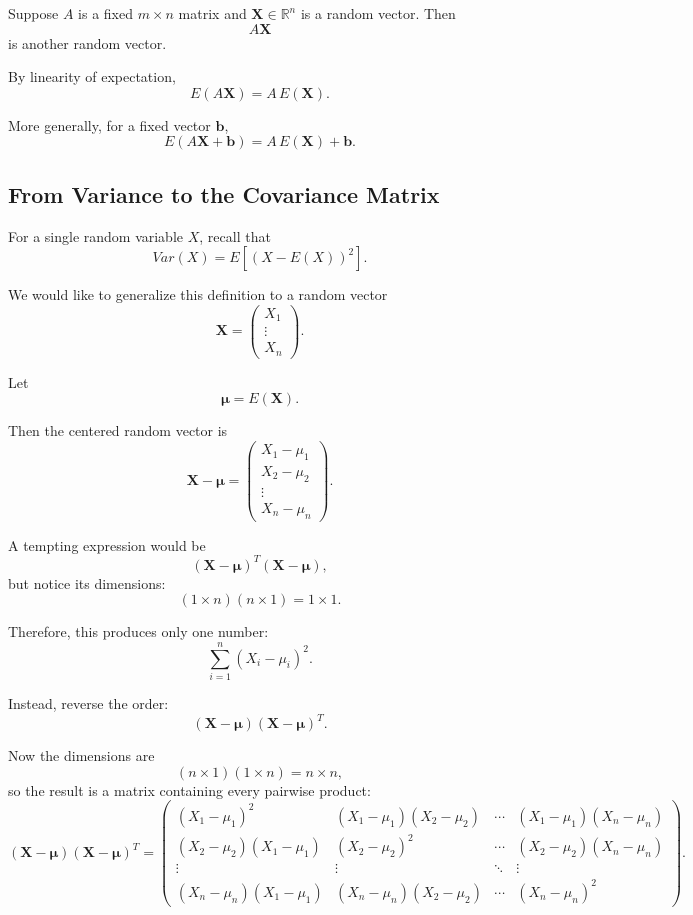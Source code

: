 \documentclass[11pt]{article}
\theoremstyle{definition}
\theoremstyle{plain}
\theoremstyle{remark}
\begin{document}
Suppose $A$ is a fixed $m\times n$ matrix and
$\mathbf{X}\in\mathbb{R}^n$ is a random vector. Then
\[
A\mathbf{X}
\]
is another random vector.

By linearity of expectation,
\[
{
E(A\mathbf{X})=A\,E(\mathbf{X}).
}
\]

More generally, for a fixed vector $\mathbf{b}$,
\[
{
E(A\mathbf{X}+\mathbf{b})
=
A\,E(\mathbf{X})+\mathbf{b}.
}
\]


\subsection*{From Variance to the Covariance Matrix}

For a single random variable $X$, recall that
\[
Var(X)
=
E\left[(X-E(X))^2\right].
\]

We would like to generalize this definition to a random vector
\[
\mathbf{X}
=
\begin{pmatrix}
X_1\\
\vdots\\
X_n
\end{pmatrix}.
\]

Let
\[
\boldsymbol{\mu}=E(\mathbf{X}).
\]

Then the centered random vector is
\[
\mathbf{X}-\boldsymbol{\mu}
=
\begin{pmatrix}
X_1-\mu_1\\
X_2-\mu_2\\
\vdots\\
X_n-\mu_n
\end{pmatrix}.
\]

A tempting expression would be
\[
(\mathbf{X}-\boldsymbol{\mu})^T
(\mathbf{X}-\boldsymbol{\mu}),
\]
but notice its dimensions:
\[
(1\times n)(n\times1)
=
1\times1.
\]

Therefore, this produces only one number:
\[
\sum_{i=1}^n(X_i-\mu_i)^2.
\]

Instead, reverse the order:
\[
(\mathbf{X}-\boldsymbol{\mu})
(\mathbf{X}-\boldsymbol{\mu})^T.
\]

Now the dimensions are
\[
(n\times1)(1\times n)
=
n\times n,
\]
so the result is a matrix containing every pairwise product:
\[
(\mathbf{X}-\boldsymbol{\mu})
(\mathbf{X}-\boldsymbol{\mu})^T
=
\begin{pmatrix}
(X_1-\mu_1)^2
&
(X_1-\mu_1)(X_2-\mu_2)
&
\cdots
&
(X_1-\mu_1)(X_n-\mu_n)
\\
(X_2-\mu_2)(X_1-\mu_1)
&
(X_2-\mu_2)^2
&
\cdots
&
(X_2-\mu_2)(X_n-\mu_n)
\\
\vdots&\vdots&\ddots&\vdots\\
(X_n-\mu_n)(X_1-\mu_1)
&
(X_n-\mu_n)(X_2-\mu_2)
&
\cdots
&
(X_n-\mu_n)^2
\end{pmatrix}.
\]
\end{document}
